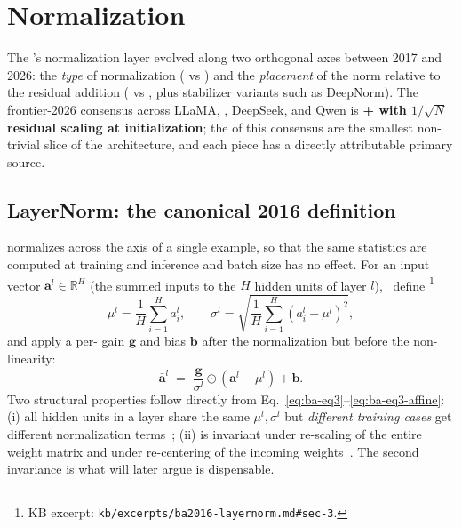 
\section{Normalization}
\label{sec:normalization-axis}
\label{sec:norm}

The 's normalization layer evolved along two orthogonal axes
between 2017 and 2026: the \emph{type} of normalization ( vs
) and the \emph{placement} of the norm relative to the residual
addition ( vs , plus stabilizer variants such as DeepNorm).
The frontier-2026 consensus across LLaMA, , DeepSeek, and Qwen is
\textbf{ +  with $1/\sqrt{N}$ residual scaling at
initialization}; the  of this consensus are the smallest
non-trivial slice of the architecture, and each piece has a directly
attributable primary source.

\subsection{LayerNorm: the canonical 2016 definition}
\label{sec:norm-layernorm}

 normalizes across the  axis of a single example, so
that the same statistics are computed at training and inference and
batch size has no effect. For an input vector
$\mathbf{a}^l \in \mathbb{R}^H$ (the summed inputs to the $H$ hidden
units of layer $l$),~\citet{ba2016-layernorm} define%
\footnote{KB excerpt: \nolinkurl{kb/excerpts/ba2016-layernorm.md#sec-3}.}
\begin{equation}
  \mu^l = \frac{1}{H} \sum_{i=1}^{H} a_i^l,
  \qquad
  \sigma^l = \sqrt{\frac{1}{H} \sum_{i=1}^{H} (a_i^l - \mu^l)^2},
  \tag{Ba--Eq.~3}
  \label{eq:ba-eq3}
\end{equation}
and apply a per- gain $\mathbf{g}$ and bias $\mathbf{b}$ after
the normalization but before the non-linearity:
\begin{equation}
  \bar{\mathbf{a}}^l \;=\; \frac{\mathbf{g}}{\sigma^l} \odot
  (\mathbf{a}^l - \mu^l) + \mathbf{b}.
  \label{eq:ba-eq3-affine}
\end{equation}
Two structural properties follow directly from
Eq.~\eqref{eq:ba-eq3}--\eqref{eq:ba-eq3-affine}: (i) all hidden units in
a layer share the same $\mu^l, \sigma^l$ but \emph{different training
cases} get different normalization terms~\citep[\S 3]{ba2016-layernorm};
(ii)  is invariant under re-scaling of the entire weight
matrix and under re-centering of the incoming
weights~\citep[\S 4, Table~1]{ba2016-layernorm}. The second invariance
is what \citet{zhang2019} will later argue is dispensable.

